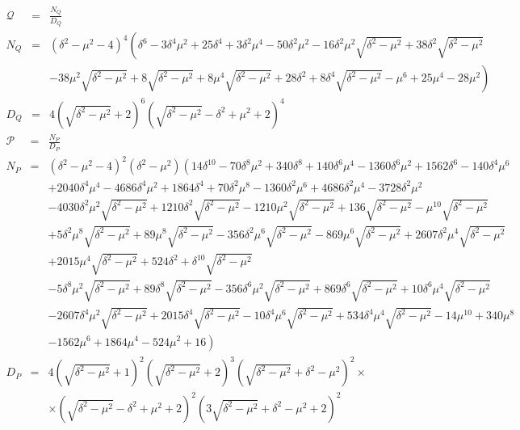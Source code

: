 \documentclass[10pt,a4paper]{article}
\begin{document}
\begin{eqnarray}
\label{Qfun}
  \mathcal{Q} &=& \frac{N_Q}{D_Q} \nonumber \\
  N_Q &=& \left(\delta ^2-\mu ^2-4\right)^4 \left(\delta ^6-3 \delta ^4 \mu ^2+25 \delta ^4+3
   \delta ^2 \mu ^4-50 \delta ^2 \mu ^2-16 \delta ^2 \mu ^2 \sqrt{\delta ^2-\mu ^2}+38
   \delta ^2 \sqrt{\delta ^2-\mu ^2}\right.\nonumber\\
   &&\left.-38 \mu ^2 \sqrt{\delta ^2-\mu ^2}+8 \sqrt{\delta
   ^2-\mu ^2}+8 \mu ^4 \sqrt{\delta ^2-\mu ^2}+28 \delta ^2+8 \delta ^4 \sqrt{\delta
   ^2-\mu ^2}-\mu ^6+25 \mu ^4-28 \mu ^2\right)\nonumber \\
  D_Q &=&4 \left(\sqrt{\delta ^2-\mu ^2}+2\right)^6 \left(\sqrt{\delta ^2-\mu ^2}-\delta ^2+\mu
   ^2+2\right)^4
\end{eqnarray}
\begin{eqnarray}
\label{Pfun}
  \mathcal{P} &=& \frac{N_P}{D_P} \nonumber \\
  N_P &=& \left(\delta ^2-\mu ^2-4\right)^2 \left(\delta ^2-\mu ^2\right) \left(14 \delta ^{10}-70
   \delta ^8 \mu ^2+340 \delta ^8+140 \delta ^6 \mu ^4-1360 \delta ^6 \mu ^2+1562 \delta
   ^6-140 \delta ^4 \mu ^6\right.\nonumber\\
   &&\left.+2040 \delta ^4 \mu ^4-4686 \delta ^4 \mu ^2+1864 \delta ^4+70
   \delta ^2 \mu ^8-1360 \delta ^2 \mu ^6+4686 \delta ^2 \mu ^4-3728 \delta ^2 \mu
   ^2\right.\nonumber\\
   &&\left.-4030 \delta ^2 \mu ^2 \sqrt{\delta ^2-\mu ^2}+1210 \delta ^2 \sqrt{\delta ^2-\mu
   ^2}-1210 \mu ^2 \sqrt{\delta ^2-\mu ^2}+136 \sqrt{\delta ^2-\mu ^2}-\mu ^{10}
   \sqrt{\delta ^2-\mu ^2}\right.\nonumber\\
   &&\left.+5 \delta ^2 \mu ^8 \sqrt{\delta ^2-\mu ^2}+89 \mu ^8
   \sqrt{\delta ^2-\mu ^2}-356 \delta ^2 \mu ^6 \sqrt{\delta ^2-\mu ^2}-869 \mu ^6
   \sqrt{\delta ^2-\mu ^2}+2607 \delta ^2 \mu ^4 \sqrt{\delta ^2-\mu ^2}\right.\nonumber\\
   &&\left. +2015 \mu ^4
   \sqrt{\delta ^2-\mu ^2}+524 \delta ^2+\delta ^{10} \sqrt{\delta ^2-\mu ^2}\right.\nonumber\\
   &&\left.-5 \delta
   ^8 \mu ^2 \sqrt{\delta ^2-\mu ^2}+89 \delta ^8 \sqrt{\delta ^2-\mu ^2}-356 \delta ^6
   \mu ^2 \sqrt{\delta ^2-\mu ^2}+869 \delta ^6 \sqrt{\delta ^2-\mu ^2}+10 \delta ^6 \mu
   ^4 \sqrt{\delta ^2-\mu ^2}\right.\nonumber\\
   &&\left.-2607 \delta ^4 \mu ^2 \sqrt{\delta ^2-\mu ^2}+2015 \delta
   ^4 \sqrt{\delta ^2-\mu ^2}-10 \delta ^4 \mu ^6 \sqrt{\delta ^2-\mu ^2}+534 \delta ^4
   \mu ^4 \sqrt{\delta ^2-\mu ^2}-14 \mu ^{10}+340 \mu ^8\right.\nonumber\\
   &&\left.-1562 \mu ^6+1864 \mu ^4-524
   \mu ^2+16\right) \nonumber\\
  D_P &=&4 \left(\sqrt{\delta ^2-\mu ^2}+1\right)^2 \left(\sqrt{\delta ^2-\mu ^2}+2\right)^3
   \left(\sqrt{\delta ^2-\mu ^2}+\delta ^2-\mu ^2\right)^2 \times \nonumber\\
   &&\times\left(\sqrt{\delta ^2-\mu
   ^2}-\delta ^2+\mu ^2+2\right)^2 \left(3 \sqrt{\delta ^2-\mu ^2}+\delta ^2-\mu
   ^2+2\right)^2
\end{eqnarray}
\end{document}
